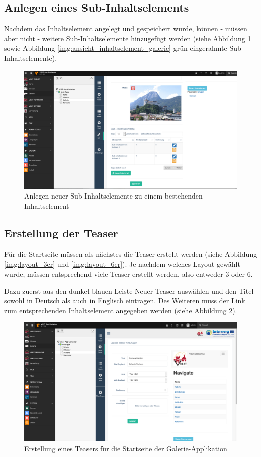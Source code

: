 \subsection{Anlegen eines Sub-Inhaltselements}
Nachdem das Inhaltselement angelegt und gespeichert wurde, können - müssen aber nicht - weitere Sub-Inhaltselemente hinzugefügt werden (siehe Abbildung \ref{img:anlegen_neuer_Sub_inhaltselemente} sowie Abbildung \ref{img:ansicht_inhaltselement_galerie} grün eingerahmte Sub-Inhaltselemente).

\begin{figure}[ht!]
\centering
\includegraphics[width=12cm]{Figures/paula/galerie/anlegen_neuer_Sub_inhaltselemente.png}
\caption{Anlegen neuer Sub-Inhaltselemente zu einem bestehenden Inhaltselement}
\label{img:anlegen_neuer_Sub_inhaltselemente}
\end{figure}


\subsection{Erstellung der Teaser}

Für die Startseite müssen als nächstes die Teaser erstellt werden (siehe Abbildung \ref{img:layout_3er} und \ref{img:layout_6er}). Je nachdem welches Layout gewählt wurde, müssen entsprechend viele Teaser erstellt werden, also entweder 3 oder 6. 

Dazu zuerst aus den dunkel blauen Leiste \glqq Neuer Teaser\grqq{} auswählen und den Titel sowohl in Deutsch als auch in Englisch eintragen. Des Weiteren muss der Link zum entsprechenden Inhaltselement angegeben werden (siehe Abbildung \ref{img:erstellung_teaser}). 

\begin{figure}[ht!]
\centering
\includegraphics[width=12cm]{Figures/paula/galerie/erstellung_teaser.png}
\caption{Erstellung eines Teasers für die Startseite der Galerie-Applikation}
\label{img:erstellung_teaser}
\end{figure}

